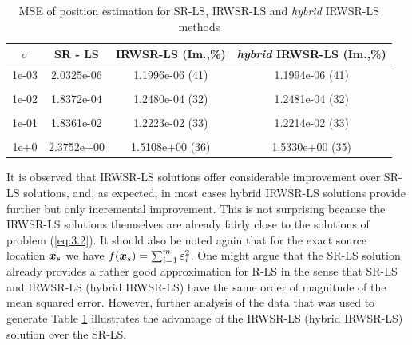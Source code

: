 
\begin{table}[h]
\centering
\caption{MSE of position estimation for SR-LS, IRWSR-LS and \textit{hybrid} IRWSR-LS methods}
\begin{tabular}{|c|c|c|c|} \hline
\centering
$\sigma$ & SR - LS & IRWSR-LS (Im.,\%) & \textit{hybrid} IRWSR-LS (Im.,\%) \\ \hline
1e-03&	2.0325e-06&	1.1996e-06 (41)	& 1.1994e-06 (41)\\ &&&\\
1e-02&	1.8372e-04&	1.2480e-04 (32)	& 1.2481e-04 (32)\\ &&&\\
1e-01&	1.8361e-02&	1.2223e-02 (33)	& 1.2214e-02 (33)\\ &&&\\
1e+0&	2.3752e+00&	1.5108e+00 (36)	& 1.5330e+00 (35)\\ %
\hline
\end{tabular}
\label{tab:1}
\end{table}


It is observed that IRWSR-LS solutions offer considerable improvement over SR-LS solutions, and, as expected, in most cases hybrid IRWSR-LS solutions provide further but only incremental improvement. This is not surprising because the IRWSR-LS solutions themselves are already fairly close to the solutions of problem (\ref{eq:3.2}). It should also be noted again that for the exact source location $\mbox{\boldmath$x$}_s$ we have $f(\mbox{\boldmath$x$}_s) = \sum_{i=1}^m \varepsilon_i^2$. One might argue that the SR-LS solution already provides a rather good approximation for R-LS in the sense that SR-LS and IRWSR-LS (hybrid IRWSR-LS) have the same order of magnitude of the mean squared error. However, further analysis of the data that was used to generate Table \ref{tab:1} illustrates the advantage of the IRWSR-LS (hybrid IRWSR-LS) solution over the SR-LS.

